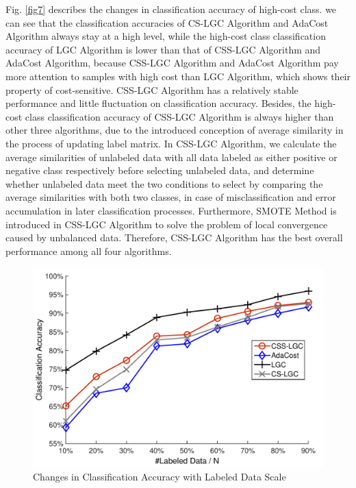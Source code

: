 \documentclass{svjour3}                     %
\begin{document}
Fig. \ref{fig7} describes the changes in classification accuracy of high-cost class. we can see that the classification accuracies of CS-LGC Algorithm and AdaCost Algorithm always stay at a high level, while the high-cost class classification accuracy of LGC Algorithm is lower than that of CSS-LGC Algorithm and AdaCost Algorithm, because CSS-LGC Algorithm and AdaCost Algorithm pay more attention to samples with high cost than LGC Algorithm, which shows their property of cost-sensitive. CSS-LGC Algorithm has a relatively stable performance and little fluctuation on classification accuracy. Besides, the high-cost class classification accuracy of CSS-LGC Algorithm is always higher than other three algorithms, due to the introduced conception of average similarity in the process of updating label matrix. In CSS-LGC Algorithm, we calculate the average similarities of unlabeled data with all data labeled as either positive or negative class respectively before selecting unlabeled data, and determine whether unlabeled data meet the two conditions to select by comparing the average similarities with both two classes, in case of misclassification and error accumulation in later classification processes. Furthermore, SMOTE Method is introduced in CSS-LGC Algorithm to solve the problem of local convergence caused by unbalanced data. Therefore, CSS-LGC Algorithm has the best overall performance among all four algorithms.

\begin{figure}[h]
\includegraphics[width=\textwidth]{plot/fig8.pdf}
\caption{Changes in Classification Accuracy with Labeled Data Scale} \label{fig8}
\end{figure}
\end{document}
